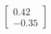 \documentclass[preview]{standalone}
\begin{document}
\begin{align*}
\begin{bmatrix} 0.42 \\ -0.35 \end{bmatrix}
\end{align*}
\end{document}
